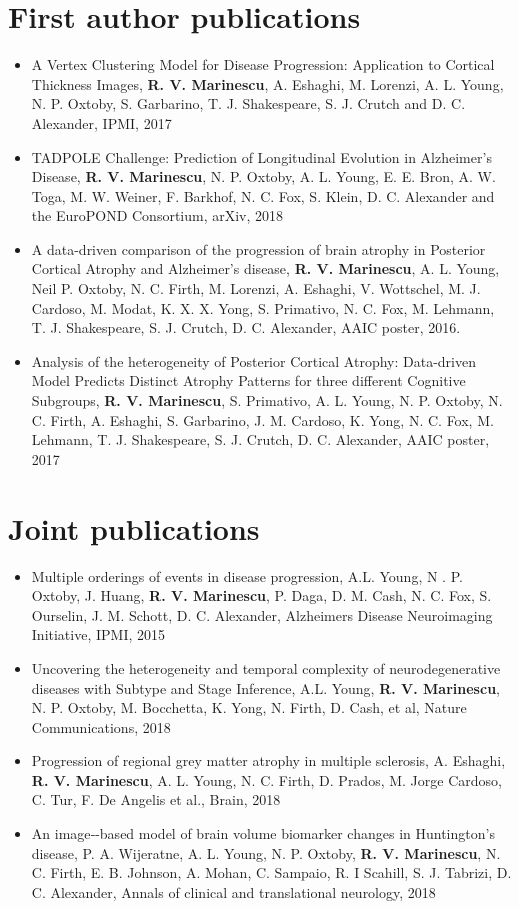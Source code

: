 \documentclass[a4paper,10pt]{article} %
\begin{document}
\section*{First author publications}
\begin{itemize}
 \item A Vertex Clustering Model for Disease Progression: Application to Cortical Thickness Images, \textbf{R. V. Marinescu}, A. Eshaghi, M. Lorenzi, A. L. Young, N. P. Oxtoby, S. Garbarino, T. J. Shakespeare, S. J. Crutch and D. C. Alexander, IPMI, 2017
 \item TADPOLE Challenge: Prediction of Longitudinal Evolution in Alzheimer's Disease, \textbf{R. V. Marinescu}, N. P. Oxtoby, A. L. Young, E. E. Bron, A. W. Toga, M. W. Weiner, F. Barkhof, N. C. Fox, S. Klein, D. C. Alexander and the EuroPOND Consortium, arXiv, 2018 
 \item A data-driven comparison of the progression of brain atrophy in Posterior Cortical Atrophy and Alzheimer's disease, \textbf{R. V. Marinescu}, A. L. Young, Neil P. Oxtoby, N. C. Firth, M. Lorenzi, A. Eshaghi, V. Wottschel, M. J. Cardoso, M. Modat, K. X. X. Yong, S. Primativo, N. C. Fox, M. Lehmann, T. J. Shakespeare, S. J. Crutch, D. C. Alexander, AAIC poster, 2016.
 \item Analysis of the heterogeneity of Posterior Cortical Atrophy: Data-driven Model Predicts Distinct Atrophy Patterns for three different Cognitive Subgroups, \textbf{R. V. Marinescu}, S. Primativo, A. L. Young, N. P. Oxtoby, N. C. Firth, A. Eshaghi, S. Garbarino, J. M. Cardoso, K. Yong, N. C. Fox, M. Lehmann, T. J. Shakespeare, S. J. Crutch, D. C. Alexander, AAIC poster, 2017 
\end{itemize}

\section*{Joint publications}
\begin{itemize}
\item Multiple orderings of events in disease progression, A.L. Young, N . P. Oxtoby, J. Huang, \textbf{R. V. Marinescu}, P. Daga, D. M. Cash, N. C. Fox, S. Ourselin, J. M. Schott, D. C. Alexander, Alzheimers Disease Neuroimaging Initiative, IPMI, 2015
\item Uncovering the heterogeneity and temporal complexity of neurodegenerative diseases with Subtype and Stage Inference, A.L. Young, \textbf{R. V. Marinescu}, N. P. Oxtoby, M. Bocchetta, K. Yong, N. Firth, D. Cash, et al, Nature Communications, 2018
\item Progression of regional grey matter atrophy in multiple sclerosis, A. Eshaghi, \textbf{R. V. Marinescu}, A. L. Young, N. C. Firth, D. Prados, M. Jorge Cardoso, C. Tur, F. De Angelis et al., Brain, 2018
\item An image‐-based model of brain volume biomarker changes in Huntington's disease, P. A. Wijeratne, A. L. Young, N. P. Oxtoby, \textbf{R. V. Marinescu}, N. C. Firth, E. B. Johnson, A. Mohan, C. Sampaio, R. I Scahill, S. J. Tabrizi, D. C. Alexander, Annals of clinical and translational neurology, 2018
\end{itemize}


\end{document}
